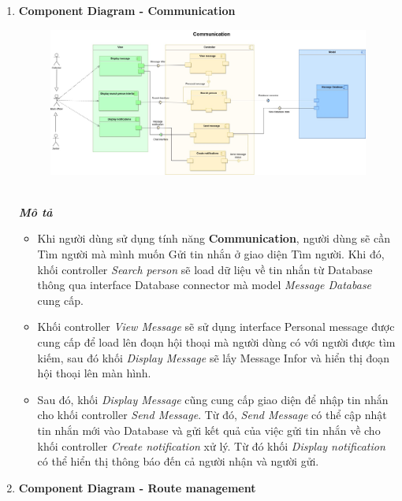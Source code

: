 \documentclass[a4paper]{article}
\begin{document}
\begin{enumerate}
\begin{itemize}
    \end{itemize}
    \newpage
    \item \textbf{Component Diagram - Communication}
    \begin{figure}[!h]
    \begin{center}
        \includegraphics[width=6in]{Image/com_componentdiagram.jpeg}
    \end{center}
    \end{figure}\\
        \textbf{\textit{Mô tả}}
    \begin{itemize}
        \item Khi người dùng sử dụng tính năng \textbf{Communication}, người dùng sẽ cần Tìm người mà mình muốn Gửi tin nhắn ở giao diện Tìm người. Khi đó, khối controller \textit{Search person} sẽ load dữ liệu về tin nhắn từ Database thông qua interface Database connector mà model \textit{Message Database} cung cấp.
        \item Khối controller \textit{View Message} sẽ sử dụng interface Personal message được cung cấp để load lên đoạn hội thoại mà người dùng có với người được tìm kiếm, sau đó khối \textit{Display Message} sẽ lấy Message Infor và hiển thị đoạn hội thoại lên màn hình.
        \item Sau đó, khối \textit{Display Message} cũng cung cấp giao diện để nhập tin nhắn cho khối controller \textit{Send Message}. Từ đó, \textit{Send Message} có thể cập nhật tin nhắn mới vào Database và gửi kết quả của việc gửi tin nhắn về cho khối controller \textit{Create notification} xử lý. Từ đó khối \textit{Display notification} có thể hiển thị thông báo đến cả người nhận và người gửi.
    \end{itemize}
        \item \textbf{Component Diagram - Route management}
        \newpage
        \begin{figure}
            \centering

\end{figure}
\end{enumerate}
\end{document}
